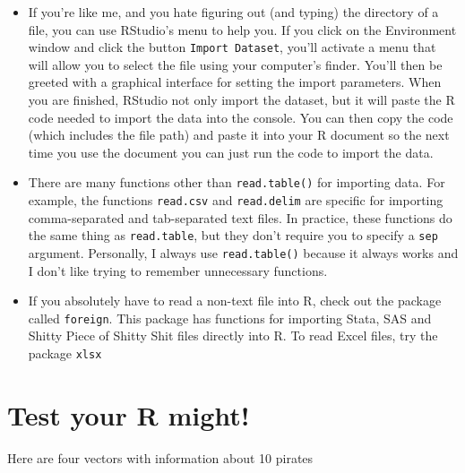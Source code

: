 \documentclass{tufte-book}\usepackage[]{graphicx}\usepackage[]{color}
\begin{document}
\begin{itemize}

  \item If you're like me, and you hate figuring out (and typing) the directory of a file, you can use RStudio's menu to help you. If you click on the Environment window and click the button \texttt{Import Dataset}, you'll activate a menu that will allow you to select the file using your computer's finder. You'll then be greeted with a graphical interface for setting the import parameters. When you are finished, RStudio not only import the dataset, but it will paste the R code needed to import the data into the console. You can then copy the code (which includes the file path) and paste it into your R document so the next time you use the document you can just run the code to import the data.

  \item There are many functions other than \texttt{read.table()} for importing data. For example, the functions \texttt{read.csv} and \texttt{read.delim} are specific for importing comma-separated and tab-separated text files. In practice, these functions do the same thing as \texttt{read.table}, but they don't require you to specify a \texttt{sep} argument. Personally, I always use \texttt{read.table()} because it always works and I don't like trying to remember unnecessary functions.

  \item If you absolutely have to read a non-text file into R, check out the package called \texttt{foreign}. This package has functions for importing Stata, SAS and Shitty Piece of Shitty Shit files directly into R. To read Excel files, try the package \texttt{xlsx}

\end{itemize}

\section{Test your R might!}

Here are four vectors with information about 10 pirates
\end{document}
